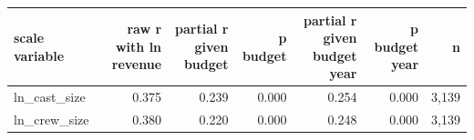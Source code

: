 \begin{tabular}{lrrrrrr}
\toprule
scale variable & raw r with ln revenue & partial r given budget & p budget & partial r given budget year & p budget year & n \\
\midrule
ln\_cast\_size & 0.375 & 0.239 & 0.000 & 0.254 & 0.000 & 3,139 \\
ln\_crew\_size & 0.380 & 0.220 & 0.000 & 0.248 & 0.000 & 3,139 \\
\bottomrule
\end{tabular}